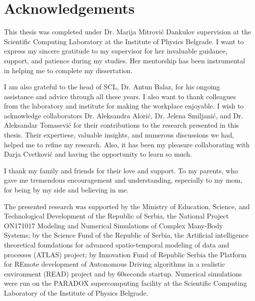 
\normalsize
\chapter{Acknowledgements}

This thesis was completed under Dr. Marija Mitrović Dankulov supervision at the Scientific Computing Laboratory at the Institute of Physics Belgrade. I want to express my sincere gratitude to my supervisor for her invaluable guidance, support, and patience during my studies. Her mentorship has been instrumental in helping me to complete my dissertation.  

I am also grateful to the head of SCL, Dr. Antun Balaz, for his ongoing assistance and advice through all these years. I also want to thank colleagues from the laboratory and institute for making the workplace enjoyable. I wish to acknowledge collaborators Dr. Aleksandra Alorić, Dr. Jelena Smiljanić, and Dr. Aleksandar Tomasević for their contributions to the research presented in this thesis. Their expertiese, valuable insights, and numerous discussions we had, helped me to refine my research. Also, it has been my pleasure collaborating with Darja Cvetković and having the opportunity to learn so much.

I thank my family and friends for their love and support. To my parents, who gave me tremendous encouragement and understanding, especially to my mom, for being by my side and believing in me.

The presented research was supported by the Ministry of Education, Science, and Technological Development of the Republic of Serbia, the National Project ON171017 Modeling and Numerical Simulations of Complex Many-Body Systems; by the Science Fund of the Republic of Serbia, the Artificial intelligence theoretical foundations for advanced spatio-temporal modeling of data and processes (ATLAS) project; by Innovation Fund of Republic Serbia the Platform for REmote development of Autonomous Driving algorithms in a realistic environment (READ) project and by 60seconds startup. Numerical simulations were run on the PARADOX supercomputing facility at the Scientific Computing Laboratory of the Institute of Physics Belgrade.

\hfill

\justify
